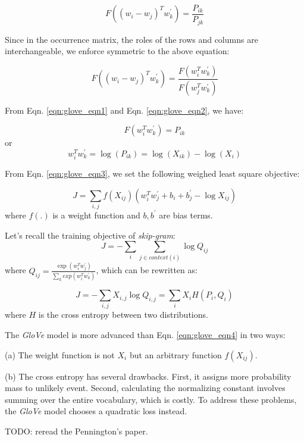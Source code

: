 \documentclass[11pt,letterpaper]{article}
\begin{document}
\begin{equation}
  F \left( (w_i - w_j)^T w^{'}_k \right) = \frac{P_{ik}}{P_{jk}}
  \label{eqn:glove_eqn1}
\end{equation}

Since in the occurrence matrix, the roles of the rows and columns are interchangeable, we enforce symmetric to the above equation:

\begin{equation}
  F \left( (w_i - w_j)^T w^{'}_k \right) = \frac{F(w_i^T w^{'}_k)}{F(w_j^T w^{'}_k)}  
  \label{eqn:glove_eqn2}
\end{equation}

From Eqn. \ref{eqn:glove_eqn1} and Eqn. \ref{eqn:glove_eqn2}, we have:

\begin{equation}
  F(w_i^T w^{'}_k) = P_{ik}
\end{equation}
or
\begin{equation}
  w_i^T w^{'}_k = \log (P_{ik}) = \log (X_{ik}) - \log (X_i)
  \label{eqn:glove_eqn3}
\end{equation}

From Eqn. \ref{eqn:glove_eqn3}, we set the following weighed least square objective:

\begin{equation}
  J = \sum_{i,j} f(X_{ij}) (w_i^T w^{'}_j + b_i + b^{'}_j - \log X_{ij})
\end{equation} 
where $f(.)$ is a weight function and $b, b^{'}$ are bias terms. 

Let's recall the training objective of \emph{skip-gram}:
\begin{equation}
  J = -\sum_{i} \sum_{j \in context(i)} \log Q_{ij}
\end{equation} where $Q_{ij} = \frac{\exp (w_i^T w^{'}_j)}{\sum_k exp(w_i^T w^{'}_k)}$, which can be rewritten as:

\begin{equation}
  J = -\sum_{i, j} X_{i,j} \log Q_{i,j} = \sum_i X_i H(P_i, Q_i)
  \label{eqn:glove_eqn4}
\end{equation} where $H$ is the cross entropy between two distributions.  

The \emph{GloVe} model is more advanced than Eqn. \ref{eqn:glove_eqn4} in two ways:

(a) The weight function is not $X_i$ but an arbitrary function $f(X_{ij})$.

(b) The cross entropy has several drawbacks. First, it assigns more probability mass to unlikely event. Second, calculating the normalizing constant involves summing over the entire vocabulary, which is costly. To address these problems, the \emph{GloVe} model chooses a quadratic loss instead.

TODO: reread the Pennington's paper.
\end{document}

